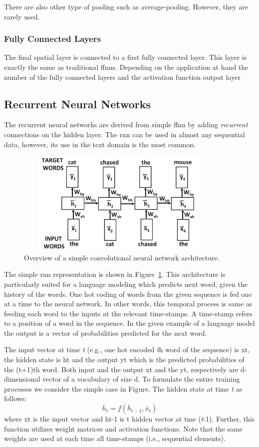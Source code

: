 There are also other type of pooling such as average-pooling. However, they are rarely used. 
\subsubsection{Fully Connected Layers}
The final spatial layer is connected to a first fully connected layer. This layer is exactly the same as traditional ffnns. Depending on the application at hand the number of the fully connected layers and the activation function output layer  

\subsection{Recurrent Neural Networks}
The recurrent neural networks are derived from  simple ffnn by adding \textit{recurrent} connections on the hidden layer. The rnn can be used in almost any sequential data, however, its use in the text domain is the most common.  
\begin{figure}[h]
\centering
 \includegraphics[height=5cm, width=10cm]{Figures/fig_rnn.png}
 \caption{Overview of a simple convolutional neural network architecture.}
 \label{fig:rnn}
\end{figure}
The simple rnn representation is shown in Figure~\ref{fig:rnn}. This architecture is particularly suited for a language modeling which predicts next word, given the history of the words. One hot coding of words from the given sequence is fed one at a time to the neural network. In other words, this temporal process is same as feeding each word to the inputs at the relevant time-stamps. A time-stamp refers to a position of a word in the sequence. In the given example of a language model the output is a vector of probabilities predicted for the next word. %

The input vector at time \textit{t} (e.g., one hot encoded \textit{t}h word of the sequence) is xt, the hidden state is ht and the output yt which is the predicted probabilities of the (t+1)th word. Both input and the output xt and the yt, respectively are d-dimensional vector of a vocabulary of size d. To formulate the entire training processes we consider the simple case in Figure. The hidden state at time \textit{t} as follows:
    \begin{equation}
    \overline{h}_t = f(\overline{h}_{t-1},\overline{x}_{t})
\end{equation}
where xt is the input vector and ht-1 is t hidden vector at tme (\textit{t}-1). Further, this function utilizes weight matrices and activation functions. Note that the same weights are used at each time all time-stamps (i.e., sequential elements). 

